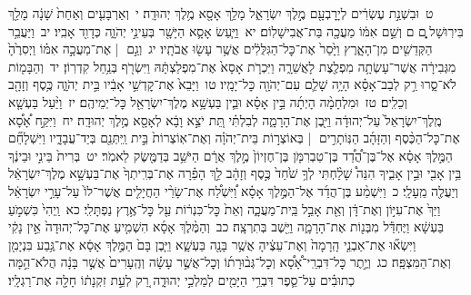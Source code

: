 \documentclass[18pt]{article}
\newcommand{\kri}[1]{\Afootnote{#1}}	%
\begin{document}
 {\loc ט~}וּבִשְׁנַ֣ת עֶשְׂרִ֔ים לְיָרׇבְעָ֖ם מֶ֣לֶךְ יִשְׂרָאֵ֑ל מָלַ֥ךְ אָסָ֖א מֶ֥לֶךְ יְהוּדָֽה׃ \startlock
 {\loc י~}וְאַרְבָּעִ֤ים וְאַחַת֙ שָׁנָ֔ה מָלַ֖ךְ בִּירֽוּשָׁל ָ֑͏ְם ם וְשֵׁ֣ם אִמּ֔וֹ מַעֲכָ֖ה בַּת־אֲבִישָׁלֽוֹם׃ \startlock
 {\loc יא~}וַיַּ֧עַשׂ אָסָ֛א הַיָּשָׁ֖ר בְּעֵינֵ֣י יְהֹוָ֑ה כְּדָוִ֖ד אָבִֽיו׃ \startlock
 {\loc יב~}וַיַּעֲבֵ֥ר הַקְּדֵשִׁ֖ים מִן־הָאָ֑רֶץ וַיָּ֙סַר֙ אֶת־כׇּל־הַגִּלֻּלִ֔ים אֲשֶׁ֥ר עָשׂ֖וּ אֲבֹתָֽיו׃ \startlock
 {\loc יג~}וְגַ֣ם  |  אֶת־מַעֲכָ֣ה אִמּ֗וֹ וַיְסִרֶ֙הָ֙ מִגְּבִירָ֔ה אֲשֶׁר־עָשְׂתָ֥ה מִפְלֶ֖צֶת לָאֲשֵׁרָ֑ה וַיִּכְרֹ֤ת אָסָא֙ אֶת־מִפְלַצְתָּ֔הּ וַיִּשְׂרֹ֖ף בְּנַ֥חַל קִדְרֽוֹן׃ \startlock
 {\loc יד~}וְהַבָּמ֖וֹת לֹא־סָ֑רוּ רַ֣ק לְבַב־אָסָ֗א הָיָ֥ה שָׁלֵ֛ם עִם־יְהֹוָ֖ה כׇּל־יָמָֽיו׃ \startlock
 {\loc טו~}וַיָּבֵא֙ אֶת־קׇדְשֵׁ֣י אָבִ֔יו  \edtext{(וקדשו)}{\kri{קרי: וְקׇדְשֵׁ֖י}}  בֵּ֣ית יְהֹוָ֑ה כֶּ֥סֶף וְזָהָ֖ב וְכֵלִֽים׃ \startlock
 {\loc טז~}וּמִלְחָמָ֨ה הָיְתָ֜ה בֵּ֣ין אָסָ֗א וּבֵ֛ין בַּעְשָׁ֥א מֶלֶךְ־יִשְׂרָאֵ֖ל כׇּל־יְמֵיהֶֽם׃ \startlock
 {\loc יז~}וַיַּ֨עַל בַּעְשָׁ֤א מֶֽלֶךְ־יִשְׂרָאֵל֙ עַל־יְהוּדָ֔ה וַיִּ֖בֶן אֶת־הָרָמָ֑ה לְבִלְתִּ֗י תֵּ֚ת יֹצֵ֣א וָבָ֔א לְאָסָ֖א מֶ֥לֶךְ יְהוּדָֽה׃ \startlock
 {\loc יח~}וַיִּקַּ֣ח אָ֠סָ֠א אֶת־כׇּל־הַכֶּ֨סֶף וְהַזָּהָ֜ב הַנּֽוֹתָרִ֣ים  |  בְּאוֹצְר֣וֹת בֵּית־יְהֹוָ֗ה וְאֶת־אֽוֹצְרוֹת֙ בֵּ֣ית  \edtext{(מלך)}{\kri{קרי: הַמֶּ֔לֶךְ}}  וַֽיִּתְּנֵ֖ם בְּיַד־עֲבָדָ֑יו וַיִּשְׁלָחֵ֞ם הַמֶּ֣לֶךְ אָסָ֗א אֶל־בֶּן־הֲ֠דַ֠ד בֶּן־טַבְרִמֹּ֤ן בֶּן־חֶזְיוֹן֙ מֶ֣לֶךְ אֲרָ֔ם הַיֹּשֵׁ֥ב בְּדַמֶּ֖שֶׂק לֵאמֹֽר׃ \startlock
 {\loc יט~}בְּרִית֙ בֵּינִ֣י וּבֵינֶ֔ךָ בֵּ֥ין אָבִ֖י וּבֵ֣ין אָבִ֑יךָ הִנֵּה֩ שָׁלַ֨חְתִּי לְךָ֥ שֹׁ֙חַד֙ כֶּ֣סֶף וְזָהָ֔ב לֵ֣ךְ הָפֵ֗רָה אֶת־בְּרִֽיתְךָ֙ אֶת־בַּעְשָׁ֣א מֶלֶךְ־יִשְׂרָאֵ֔ל וְיַעֲלֶ֖ה מֵֽעָלָֽי׃ \startlock
 {\loc כ~}וַיִּשְׁמַ֨ע בֶּן־הֲדַ֜ד אֶל־הַמֶּ֣לֶךְ אָסָ֗א וַ֠יִּשְׁלַ֠ח אֶת־שָׂרֵ֨י הַחֲיָלִ֤ים אֲשֶׁר־לוֹ֙ עַל־עָרֵ֣י יִשְׂרָאֵ֔ל וַיַּךְ֙ אֶת־עִיּ֣וֹן וְאֶת־דָּ֔ן וְאֵ֖ת אָבֵ֣ל בֵּֽית־מַעֲכָ֑ה וְאֵת֙ כׇּל־כִּנְר֔וֹת עַ֖ל כׇּל־אֶ֥רֶץ נַפְתָּלִֽי׃ \startlock
 {\loc כא~}וַֽיְהִי֙ כִּשְׁמֹ֣עַ בַּעְשָׁ֔א וַיֶּחְדַּ֕ל מִבְּנ֖וֹת אֶת־הָרָמָ֑ה וַיֵּ֖שֶׁב בְּתִרְצָֽה׃ \startlock
 {\loc כב~}וְהַמֶּ֨לֶךְ אָסָ֜א הִשְׁמִ֤יעַ אֶת־כׇּל־יְהוּדָה֙ אֵ֣ין נָקִ֔י וַיִּשְׂא֞וּ אֶת־אַבְנֵ֤י הָֽרָמָה֙ וְאֶת־עֵצֶ֔יהָ אֲשֶׁ֥ר בָּנָ֖ה בַּעְשָׁ֑א וַיִּ֤בֶן בָּם֙ הַמֶּ֣לֶךְ אָסָ֔א אֶת־גֶּ֥בַע בִּנְיָמִ֖ן וְאֶת־הַמִּצְפָּֽה׃ \startlock
 {\loc כג~}וְיֶ֣תֶר כׇּל־דִּבְרֵֽי־אָ֠סָ֠א וְכׇל־גְּב֨וּרָת֜וֹ וְכׇל־אֲשֶׁ֣ר עָשָׂ֗ה וְהֶֽעָרִים֙ אֲשֶׁ֣ר בָּנָ֔ה הֲלֹא־הֵ֣מָּה כְתוּבִ֗ים עַל־סֵ֛פֶר דִּבְרֵ֥י הַיָּמִ֖ים לְמַלְכֵ֣י יְהוּדָ֑ה רַ֚ק לְעֵ֣ת זִקְנָת֔וֹ חָלָ֖ה אֶת־רַגְלָֽיו׃ \startlock
\end{document}
